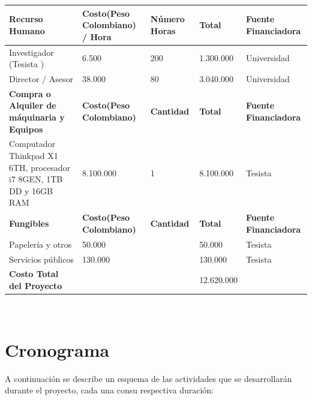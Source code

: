 \documentclass[letterpaper, 12pt, oneside]{article}
\begin{document}
	\begin{center}
    \begin{tabular}{|p{2.5cm}|p{3cm}|p{2cm}|p{2cm}|p{3cm}|}
    \hline
    \textbf{Recurso Humano} & \textbf{Costo(Peso Colombiano) / Hora } & \textbf{Número Horas} & \textbf{Total} & \textbf{Fuente Financiadora} \\
    \hline
    Investigador (Tesista   ) & 6.500 & 200 & 1.300.000 & Universidad \\
    \hline    \hline
    Director / Asesor & 38.000 & 80 & 3.040.000 & Universidad \\
    \hline
    \textbf{Compra o Alquiler de máquinaria y Equipos} & \textbf{Costo(Peso Colombiano) } & \textbf{Cantidad} & \textbf{Total} & \textbf{Fuente Financiadora} \\
    \hline
    Computador Thinkpad X1 6TH, procesador i7 8GEN, 1TB DD y 16GB RAM & 8.100.000 & 1 & 8.100.000 & Tesista  \\
    \hline

    \textbf{Fungibles} & \textbf{Costo(Peso Colombiano) } & \textbf{Cantidad} & \textbf{Total} & \textbf{Fuente Financiadora} \\
    \hline
    Papelería y otros & 50.000 &  & 50.000 & Tesista \\
    \hline
    Servicios públicos & 130.000 &  & 130.000 & Tesista  \\
    \hline
    \textbf{Costo Total del Proyecto} &  &  & 12.620.000 &  \\
    \hline
    \end{tabular}

    \end{center}\\
    
   
    
    \section{Cronograma}
    A continuación se describe un esquema de las actividades que se desarrollarán durante el proyecto, cada una consu respectiva duración:
    
\end{document}
